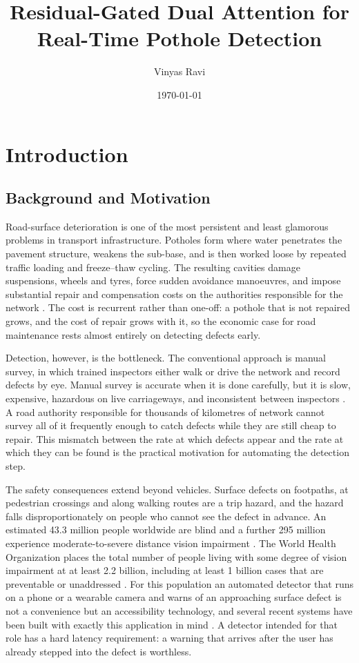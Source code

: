 \documentclass[MScCS]{uccthesis}
\title{Residual-Gated Dual Attention for Real-Time Pothole Detection}
\author{Vinyas Ravi}
\date{\today}
\begin{document}

\chapter{Introduction}
\label{ch:introduction}

\section{Background and Motivation}
\label{sec:background_motivation}

Road-surface deterioration is one of the most persistent and least glamorous
problems in transport infrastructure. Potholes form where water penetrates the
pavement structure, weakens the sub-base, and is then worked loose by repeated
traffic loading and freeze--thaw cycling. The resulting cavities damage
suspensions, wheels and tyres, force sudden avoidance manoeuvres, and impose
substantial repair and compensation costs on the authorities responsible for
the network \parencite{eriksson2008pothole,wang2020road}. The cost is
recurrent rather than one-off: a pothole that is not repaired grows, and the
cost of repair grows with it, so the economic case for road maintenance rests
almost entirely on detecting defects early.

Detection, however, is the bottleneck. The conventional approach is manual
survey, in which trained inspectors either walk or drive the network and record
defects by eye. Manual survey is accurate when it is done carefully, but it is
slow, expensive, hazardous on live carriageways, and inconsistent between
inspectors \parencite{ma2022computer}. A road authority responsible for
thousands of kilometres of network cannot survey all of it frequently enough to
catch defects while they are still cheap to repair. This mismatch between the
rate at which defects appear and the rate at which they can be found is the
practical motivation for automating the detection step.

The safety consequences extend beyond vehicles. Surface defects on footpaths,
at pedestrian crossings and along walking routes are a trip hazard, and the
hazard falls disproportionately on people who cannot see the defect in advance.
An estimated 43.3 million people worldwide are blind and a further 295 million
experience moderate-to-severe distance vision impairment
\parencite{gbd2021vision}. The World Health Organization places the total number
of people living with some degree of vision impairment at at least 2.2 billion,
including at least 1 billion cases that are preventable or unaddressed
\parencite{who2024blindness}. For this population an automated detector that
runs on a phone or a wearable camera and warns of an approaching surface defect
is not a convenience but an accessibility technology, and several recent systems
have been built with exactly this application in mind
\parencite{paramarthalingam2024pothole}. A detector intended for that role has a
hard latency requirement: a warning that arrives after the user has already
stepped into the defect is worthless.
\end{document}
